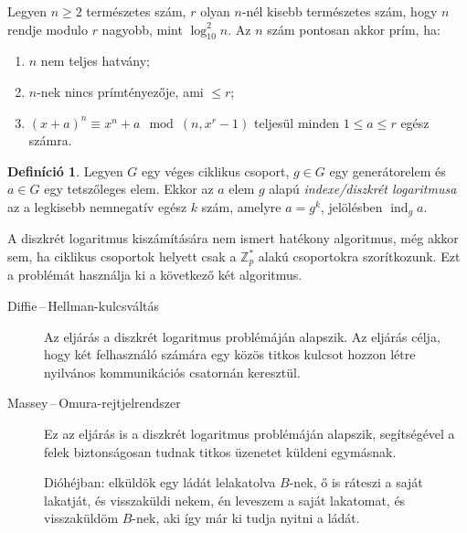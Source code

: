 \documentclass[DIV=15,appendixprefix]{scrreprt}
\theoremstyle{definition}
\newtheorem*{defin}{Definíció}
\theoremstyle{remark}
\DeclareMathOperator{\ind}{ind}
\begin{document}
\begin{description}
		Legyen $ n \ge 2 $ természetes szám, $ r $ olyan $ n $-nél kisebb természetes szám, hogy
		$ n $ rendje modulo $ r $ nagyobb, mint $ \log_{ 10 }^{ 2 } n $. Az $ n $ szám pontosan
		akkor prím, ha:
		\begin{enumerate}
		\item $ n $ nem teljes hatvány;
		\item $ n $-nek nincs prímtényezője, ami $ \le r $;
		\item $ \left( x + a \right)^{ n } \equiv x^{ n } + a \mod{ \left( n, x^{ r } - 1
			\right) } $ teljesül minden $ 1 \le a \le r $ egész számra.
		\end{enumerate}
\end{description}
%
\begin{defin}
	Legyen $G$ egy véges ciklikus csoport, $ g \in G $ egy generátorelem és $ a \in G $ egy
	tetszőleges elem. Ekkor az $ a $ elem $ g $ alapú \emph{indexe/diszkrét logaritmusa} az a
	legkisebb nemnegatív egész $ k $ szám, amelyre $ a = g^{ k }$, jelölésben $ \ind_{ g } a $.
\end{defin}
A diszkrét logaritmus kiszámítására nem ismert hatékony algoritmus, még akkor sem, ha ciklikus
csoportok helyett csak a $ \mathbb{ Z }_{ p }^{ * } $ alakú csoportokra szorítkozunk. Ezt a
problémát használja ki a következő két algoritmus.
\begin{description}
	\item[Diffie\,--\,Hellman-kulcsváltás] Az eljárás a diszkrét logaritmus problémáján alapszik. Az
		eljárás célja, hogy két felhasználó számára egy közös titkos kulcsot hozzon létre nyilvános
		kommunikációs csatornán keresztül.

	\item[Massey\,--\,Omura-rejtjelrendszer] Ez az eljárás is a diszkrét logaritmus problémáján
		alapszik, segítségével a felek biztonságosan tudnak titkos üzenetet küldeni egymásnak.

		Dióhéjban: elküldök egy ládát lelakatolva $ B $-nek, ő is ráteszi a saját lakatját,
		és visszaküldi nekem, én leveszem a saját lakatomat, és visszaküldöm $ B $-nek, aki így
		már ki tudja nyitni a ládát.
\end{description}
%
\end{document}
